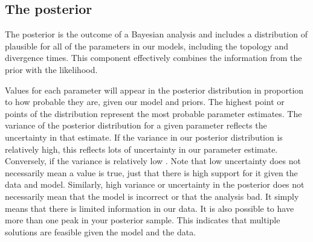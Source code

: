 \subsection{The posterior}

The posterior is the outcome of a Bayesian analysis and includes a distribution of plausible  for all of the  parameters  in our models, including the  topology and divergence times.
This component effectively combines the information from the prior with the likelihood.

Values for each parameter will appear in the posterior distribution in proportion to how probable they are, given our model and priors.
The highest point or points of the distribution represent the most probable parameter estimates.
The variance of the posterior distribution for a given parameter reflects the uncertainty in that estimate.
If the variance in our posterior distribution is relatively high, this reflects lots of uncertainty in our parameter estimate.
Conversely, if the variance is relatively low .
Note that low uncertainty does not necessarily mean a value is true, just that there is high support for it given the data and model.
Similarly, high variance or uncertainty in the posterior does not necessarily mean that the model is incorrect or that the analysis  bad. It simply means that there is limited information in our data.
It is also possible to have more than one peak in your posterior sample.
This indicates that multiple solutions are feasible given the model and the data.

